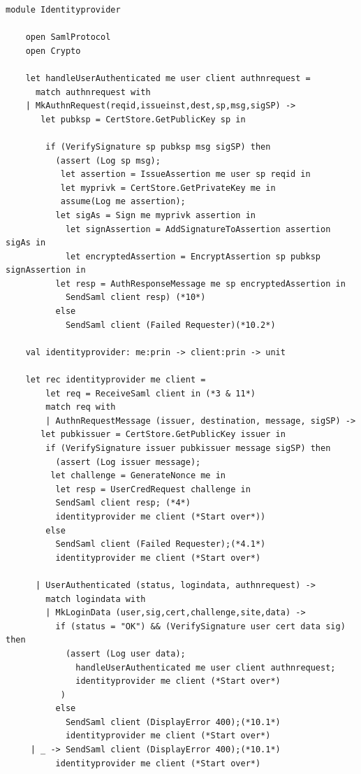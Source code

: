 \documentclass[twosided]{report}
\begin{document}
\begin{lstlisting}[style=fstar, caption={NemID identity provider implementation \cite{jacob}}]
	module Identityprovider

	open SamlProtocol
	open Crypto

	let handleUserAuthenticated me user client authnrequest =
	  match authnrequest with 
  	| MkAuthnRequest(reqid,issueinst,dest,sp,msg,sigSP) ->
   	   let pubksp = CertStore.GetPublicKey sp in
      
  	    if (VerifySignature sp pubksp msg sigSP) then
  	      (assert (Log sp msg);
 	       let assertion = IssueAssertion me user sp reqid in
 	       let myprivk = CertStore.GetPrivateKey me in
 	       assume(Log me assertion);
  	      let sigAs = Sign me myprivk assertion in
	        let signAssertion = AddSignatureToAssertion assertion sigAs in
	        let encryptedAssertion = EncryptAssertion sp pubksp 
signAssertion in
  	      let resp = AuthResponseMessage me sp encryptedAssertion in
	        SendSaml client resp) (*10*)
	      else
	        SendSaml client (Failed Requester)(*10.2*)

	val identityprovider: me:prin -> client:prin -> unit

	let rec identityprovider me client =
		let req = ReceiveSaml client in (*3 & 11*)
		match req with
		| AuthnRequestMessage (issuer, destination, message, sigSP) ->
 	   let pubkissuer = CertStore.GetPublicKey issuer in
	    if (VerifySignature issuer pubkissuer message sigSP) then
	      (assert (Log issuer message);
 	     let challenge = GenerateNonce me in
	      let resp = UserCredRequest challenge in
	      SendSaml client resp; (*4*)
	      identityprovider me client (*Start over*))
	    else
	      SendSaml client (Failed Requester);(*4.1*)
	      identityprovider me client (*Start over*)

	  | UserAuthenticated (status, logindata, authnrequest) ->
	    match logindata with 
	    | MkLoginData (user,sig,cert,challenge,site,data) ->
	      if (status = "OK") && (VerifySignature user cert data sig) then
	        (assert (Log user data);
	          handleUserAuthenticated me user client authnrequest;
	          identityprovider me client (*Start over*)
 	       )
	      else
	        SendSaml client (DisplayError 400);(*10.1*)
	        identityprovider me client (*Start over*)
 	 | _ -> SendSaml client (DisplayError 400);(*10.1*)
  	      identityprovider me client (*Start over*)
\end{lstlisting}
\end{document}
